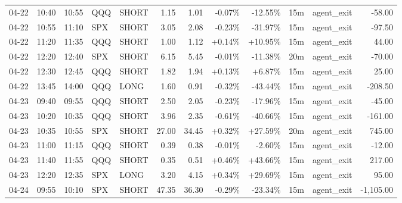 \documentclass[11pt,a4paper]{article}
\begin{document}
\begin{center}
\begin{longtable}{>{\color{txtmain}}l l l l l r r r r r >{\color{txtmain}}l r}
04-22 & 10:40 & 10:55 & QQQ & SHORT & 1.15 & 1.01 & \textcolor{lossred}{-0.07\%} & \textcolor{lossred}{-12.55\%} & 15m & agent\_exit & \textcolor{lossred}{-58.00} \\
04-22 & 10:55 & 11:10 & SPX & SHORT & 3.05 & 2.08 & \textcolor{lossred}{-0.23\%} & \textcolor{lossred}{-31.97\%} & 15m & agent\_exit & \textcolor{lossred}{-97.50} \\
04-22 & 11:20 & 11:35 & QQQ & SHORT & 1.00 & 1.12 & \textcolor{wingreen}{+0.14\%} & \textcolor{wingreen}{+10.95\%} & 15m & agent\_exit & \textcolor{wingreen}{44.00} \\
04-22 & 12:20 & 12:40 & SPX & SHORT & 6.15 & 5.45 & \textcolor{lossred}{-0.01\%} & \textcolor{lossred}{-11.38\%} & 20m & agent\_exit & \textcolor{lossred}{-70.00} \\
04-22 & 12:30 & 12:45 & QQQ & SHORT & 1.82 & 1.94 & \textcolor{wingreen}{+0.13\%} & \textcolor{wingreen}{+6.87\%} & 15m & agent\_exit & \textcolor{wingreen}{25.00} \\
04-22 & 13:45 & 14:00 & QQQ & LONG & 1.60 & 0.91 & \textcolor{lossred}{-0.32\%} & \textcolor{lossred}{-43.44\%} & 15m & agent\_exit & \textcolor{lossred}{-208.50} \\
04-23 & 09:40 & 09:55 & QQQ & SHORT & 2.50 & 2.05 & \textcolor{lossred}{-0.23\%} & \textcolor{lossred}{-17.96\%} & 15m & agent\_exit & \textcolor{lossred}{-45.00} \\
04-23 & 10:20 & 10:35 & QQQ & SHORT & 3.96 & 2.35 & \textcolor{lossred}{-0.61\%} & \textcolor{lossred}{-40.66\%} & 15m & agent\_exit & \textcolor{lossred}{-161.00} \\
04-23 & 10:35 & 10:55 & SPX & SHORT & 27.00 & 34.45 & \textcolor{wingreen}{+0.32\%} & \textcolor{wingreen}{+27.59\%} & 20m & agent\_exit & \textcolor{wingreen}{745.00} \\
04-23 & 11:00 & 11:15 & QQQ & SHORT & 0.39 & 0.38 & \textcolor{lossred}{-0.01\%} & \textcolor{lossred}{-2.60\%} & 15m & agent\_exit & \textcolor{lossred}{-12.00} \\
04-23 & 11:40 & 11:55 & QQQ & SHORT & 0.35 & 0.51 & \textcolor{wingreen}{+0.46\%} & \textcolor{wingreen}{+43.66\%} & 15m & agent\_exit & \textcolor{wingreen}{217.00} \\
04-23 & 12:20 & 12:35 & SPX & LONG & 3.20 & 4.15 & \textcolor{wingreen}{+0.34\%} & \textcolor{wingreen}{+29.69\%} & 15m & agent\_exit & \textcolor{wingreen}{95.00} \\
04-24 & 09:55 & 10:10 & SPX & SHORT & 47.35 & 36.30 & \textcolor{lossred}{-0.29\%} & \textcolor{lossred}{-23.34\%} & 15m & agent\_exit & \textcolor{lossred}{-1,105.00} \\

\end{longtable}
\end{center}
\end{document}
